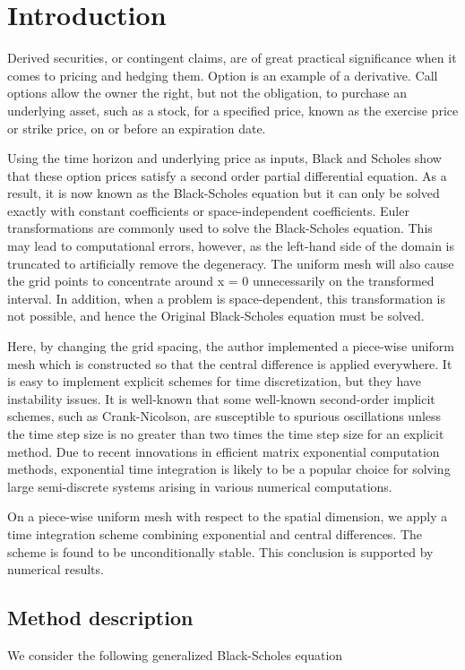 \chapter{Introduction}

Derived securities, or contingent claims, are of great practical significance when it comes to pricing and hedging them. Option is an example of a derivative. Call options allow the owner the right, but not the obligation, to purchase an underlying asset, such as a stock, for a specified price, known as the exercise price or strike price, on or before an expiration date.

Using the time horizon and underlying price as inputs, Black and Scholes show that these option prices satisfy a second order partial differential equation. As a result, it is now known as the Black-Scholes equation but it can only be solved exactly with constant coefficients or space-independent coefficients. Euler transformations are commonly used to solve the Black-Scholes equation. This may lead to computational errors, however, as the left-hand side of the domain is truncated to artificially remove the degeneracy. The uniform mesh will also cause the grid points to concentrate around x = 0 unnecessarily on the transformed interval. In addition, when a problem is space-dependent, this transformation is not possible, and hence the Original Black-Scholes equation must be solved.

Here, by changing the grid spacing, the author implemented a piece-wise uniform mesh which is constructed so that the central difference is applied everywhere. It is easy to implement explicit schemes for time discretization, but they have instability issues. It is well-known that some well-known second-order implicit schemes, such as Crank-Nicolson, are susceptible to spurious oscillations unless the time step size is no greater than two times the time step size for an explicit method. Due to recent innovations in efficient matrix exponential computation methods, exponential time integration is likely to be a popular choice for solving large semi-discrete systems arising in various numerical computations.

On a piece-wise uniform mesh with respect to the spatial dimension, we apply a time integration scheme combining exponential and central differences. The scheme is found to be unconditionally stable. This conclusion is supported by numerical results.


\section{Method description}
We consider the following generalized Black-Scholes equation

